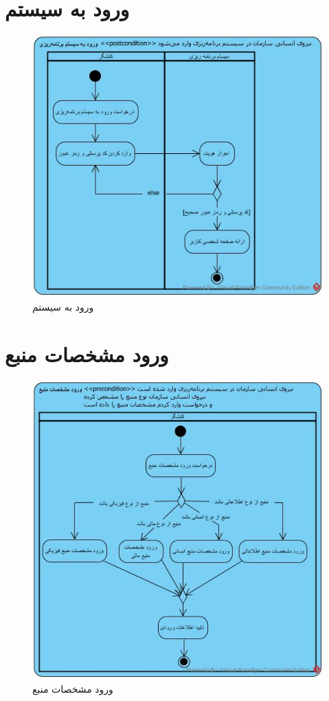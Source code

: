 \section{ورود به سیستم}
\begin{figure}[H]
	\centering
	\includegraphics[scale=0.8]{img/activity/SignIn}
	\caption{ورود به سیستم}
\end{figure}


\section{ورود مشخصات منبع}
\begin{figure}[H]
	\centering
	\includegraphics[scale=0.8]{img/activity/EnterResourceAttributes}
	\caption{ورود مشخصات منبع}
\end{figure}